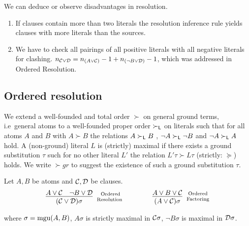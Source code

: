 We can deduce or observe disadvantages in resolution. 

\begin{enumerate}
	\item If clauses contain more than two literals the resolution inference rule yields clauses with more literals than the sources.
	\item We have to check all pairings 
	of all positive literals with all negative literals for clashing.
	$n_{{\mathcal C}\lor{\mathcal D}} = n_{(A\lor{\mathcal C})} -1 + n_{(\lnot B\lor{\mathcal D})}-1$,
	which was addressed in Ordered Resolution.
\end{enumerate}

\subsection{Ordered resolution}

\begin{definition}\label{def:orders-on-literals}
	We extend a well-founded and total order $\succ$ on general ground terms, 
	i.e~general atoms to a well-founded proper order $\succ_{\mathsf L}$ 
	on literals such that for all atoms $A$ and $B$ with $A\succ B$ 
	the relations $A\succ_{\mathsf L} B$ , 
	$\lnot A\succ_{\mathsf L}\lnot B$ and 
	$\lnot A\succ_{\mathsf L} A$ hold. 
	A (non-ground) literal $L$ is {\myem (strictly) maximal} if there exists a ground substitution $\tau$ 
	such for no other literal $L'$ the relation $L'\tau\succ L\tau$ (strictly: $\succcurlyeq$) holds.
	We write $\succ{gr}$ to suggest the existence of such a ground substitution $\tau$.
\end{definition}

\begin{definition}\label{def:ordered:resolution} 
	Let $A, B$ be atoms and ${\mathcal C},{\mathcal D}$ be clauses.
	\begin{gather*}
	\infer
	[\text{Ordered}\atop\text{Resolution	}] 
	{(\mcC\lor\mcD)\sigma}
	{A\lor\mcC&\lnot B\lor\mcD}
	\qquad\qquad
	\infer
	[\text{Ordered}\atop\text{Factoring}] 
	{(A\lor\mcC)\sigma}
	{A\lor B\lor\mcC}
	\end{gather*}
	\begin{center}
		where $\sigma=\operatorname{mgu}(A,B)$, 
		$A\sigma$ is strictly maximal in ${\mathcal C}\sigma$, 
		$\lnot B\sigma$ is maximal in ${\mathcal D}\sigma$.
	\end{center}
\end{definition}

